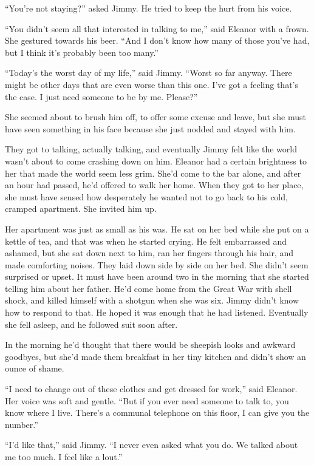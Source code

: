 \documentclass[ebook,12pt]{memoir}
\begin{document}
``You're not staying?'' asked Jimmy. He tried to keep the hurt from his
voice.

``You didn't seem all that interested in talking to me,'' said Eleanor
with a frown. She gestured towards his beer. ``And I don't know how many
of those you've had, but I think it's probably been too many.''

``Today's the worst day of my life,'' said Jimmy. ``Worst so far anyway.
There might be other days that are even worse than this one. I've got a
feeling that's the case. I just need someone to be by me. Please?''

She seemed about to brush him off, to offer some excuse and leave, but
she must have seen something in his face because she just nodded and
stayed with him.

They got to talking, actually talking, and eventually Jimmy felt like
the world wasn't about to come crashing down on him. Eleanor had a
certain brightness to her that made the world seem less grim. She'd come
to the bar alone, and after an hour had passed, he'd offered to walk her
home. When they got to her place, she must have sensed how desperately
he wanted not to go back to his cold, cramped apartment. She invited him
up.

Her apartment was just as small as his was. He sat on her bed while she
put on a kettle of tea, and that was when he started crying. He felt
embarrassed and ashamed, but she sat down next to him, ran her fingers
through his hair, and made comforting noises. They laid down side by
side on her bed. She didn't seem surprised or upset. It must have been
around two in the morning that she started telling him about her father.
He'd come home from the Great War with shell shock, and killed himself
with a shotgun when she was six. Jimmy didn't know how to respond to
that. He hoped it was enough that he had listened. Eventually she fell
asleep, and he followed suit soon after.

In the morning he'd thought that there would be sheepish looks and
awkward goodbyes, but she'd made them breakfast in her tiny kitchen and
didn't show an ounce of shame.

``I need to change out of these clothes and get dressed for work,'' said
Eleanor. Her voice was soft and gentle. ``But if you ever need someone
to talk to, you know where I live. There's a communal telephone on this
floor, I can give you the number.''

``I'd like that,'' said Jimmy. ``I never even asked what you do. We
talked about me too much. I feel like a lout.''
\end{document}
